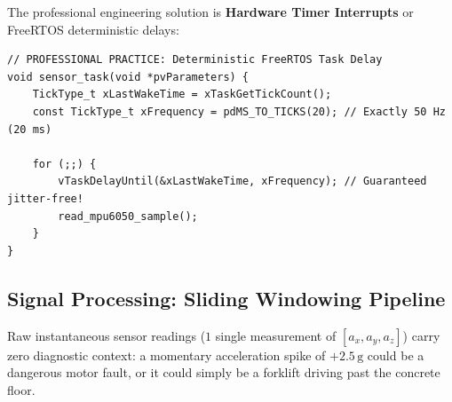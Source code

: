 The professional engineering solution is \textbf{Hardware Timer Interrupts} or FreeRTOS deterministic delays:
\begin{lstlisting}[style=pythonstyle, numbers=none]
// PROFESSIONAL PRACTICE: Deterministic FreeRTOS Task Delay
void sensor_task(void *pvParameters) {
    TickType_t xLastWakeTime = xTaskGetTickCount();
    const TickType_t xFrequency = pdMS_TO_TICKS(20); // Exactly 50 Hz (20 ms)

    for (;;) {
        vTaskDelayUntil(&xLastWakeTime, xFrequency); // Guaranteed jitter-free!
        read_mpu6050_sample();
    }
}
\end{lstlisting}

\subsection{Signal Processing: Sliding Windowing Pipeline}\label{subsec:p3_preprocessing}

Raw instantaneous sensor readings ($1$ single measurement of $[a_x, a_y, a_z]$) carry zero diagnostic context: a momentary acceleration spike of $+2.5\,\text{g}$ could be a dangerous motor fault, or it could simply be a forklift driving past the concrete floor. 


